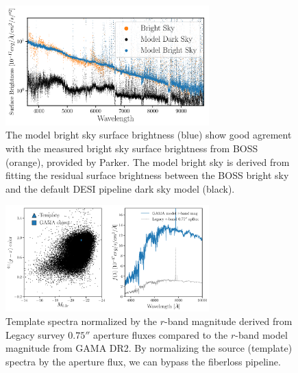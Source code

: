 \documentclass[12pt, letterpaper, preprint]{aastex}
\begin{document}
\begin{figure}
\begin{center}
    \includegraphics[width=0.7\textwidth]{figs/model_skySurfBright.pdf}
    \caption{The model bright sky surface brightness (blue) show good 
    agrement with the measured bright sky surface brightness from BOSS 
    (orange), provided by Parker. The model bright sky is derived from 
    fitting the residual surface brightness between the BOSS bright sky 
    and the default DESI pipeline dark sky model (black).}
\label{fig:sky_sbright}
\end{center}
\end{figure}


\begin{figure}
\begin{center}
    \includegraphics[width=0.7\textwidth]{figs/GLeg_rMag_norm.pdf} 
    \caption{Template spectra normalized by the $r$-band magnitude 
    derived from Legacy survey $0.75''$ aperture fluxes compared to 
    the $r$-band model magnitude from GAMA DR2. By normalizing the 
    source (template) spectra by the aperture flux, we can bypass 
    the fiberloss pipeline.}
\label{fig:rmag_norm}
\end{center}
\end{figure}
\end{document}
